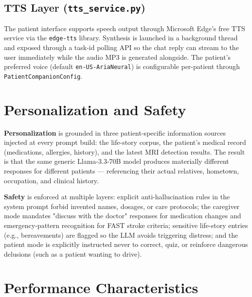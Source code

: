 \documentclass[11pt, a4paper]{article}
\begin{document}
\subsection{TTS Layer (\texttt{tts\_service.py})}

The patient interface supports speech output through Microsoft Edge's free TTS service via the \texttt{edge-tts} library. Synthesis is launched in a background thread and exposed through a task-id polling API so the chat reply can stream to the user immediately while the audio MP3 is generated alongside. The patient's preferred voice (default \texttt{en-US-AriaNeural}) is configurable per-patient through \texttt{PatientCompanionConfig}.

\section{Personalization and Safety}

\textbf{Personalization} is grounded in three patient-specific information sources injected at every prompt build: the life-story corpus, the patient's medical record (medications, allergies, history), and the latest MRI detection results. The result is that the same generic Llama-3.3-70B model produces materially different responses for different patients --- referencing their actual relatives, hometown, occupation, and clinical history.

\textbf{Safety} is enforced at multiple layers: explicit anti-hallucination rules in the system prompt forbid invented names, dosages, or care protocols; the caregiver mode mandates "discuss with the doctor" responses for medication changes and emergency-pattern recognition for FAST stroke criteria; sensitive life-story entries (e.g., bereavements) are flagged so the LLM avoids triggering distress; and the patient mode is explicitly instructed never to correct, quiz, or reinforce dangerous delusions (such as a patient wanting to drive).

\section{Performance Characteristics}
\end{document}
